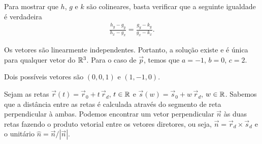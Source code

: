 \begin{questions}
\begin{solution}
    Para mostrar que $h$, $g$ e $k$ são colineares, basta verificar que a seguinte igualdade é verdadeira \vspace{-5mm}
    \begin{align*}
        \frac{h_y - g_y}{h_x - g_x} = \frac{g_y - k_y}{g_x - k_x}.
    \end{align*}
\end{solution}


\begin{solution}
    Os vetores são linearmente independentes. Portanto, a solução existe e é única para qualquer vetor do ${\mathbb R}^3$. Para o caso de $\vec p$, temos que $a=-1$, $b=0$, $c=2$.
\end{solution}


\begin{solution}
    Dois possíveis vetores são $(0,0,1)$ e $(1,-1,0)$.
\end{solution}


\begin{solution}
    Sejam as retas $\vec r(t) = \vec r_0 + t\,\vec r_d$, $t\in{\mathbb R}$ e $\vec s(w) = \vec s_0 + w\,\vec r_d$, $w\in{\mathbb R}$. Sabemos que a distância entre as retas é calculada através do segmento de reta perpendicular à ambas. Podemos encontrar um vetor perpendicular $\vec n$ às duas retas fazendo o produto vetorial entre os vetores diretores, ou seja, $\vec n = \vec r_d \times \vec s_d$ e o unitário $\hat n = \vec n/|\vec n|$.
    

\end{solution}
\end{questions}
